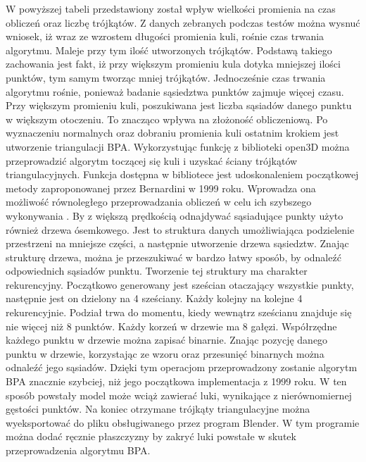 W powyższej tabeli przedstawiony został wpływ wielkości promienia na czas obliczeń oraz liczbę trójkątów. Z danych zebranych podczas testów można wysnuć wniosek, iż wraz ze wzrostem długości promienia kuli, rośnie czas trwania algorytmu. Maleje przy tym ilość utworzonych trójkątów. Podstawą takiego zachowania jest fakt, iż przy większym promieniu kula dotyka mniejszej ilości punktów, tym samym tworząc mniej trójkątów. Jednocześnie czas trwania algorytmu rośnie, ponieważ badanie sąsiedztwa punktów zajmuje więcej czasu. Przy większym promieniu kuli, poszukiwana jest liczba sąsiadów danego punktu w większym otoczeniu. To znacząco wpływa na złożoność obliczeniową.
\newline \indent Po wyznaczeniu normalnych oraz dobraniu promienia kuli ostatnim krokiem jest utworzenie triangulacji BPA. Wykorzystując funkcję z biblioteki open3D można przeprowadzić algorytm toczącej się kuli i uzyskać ściany trójkątów triangulacyjnych. Funkcja dostępna w bibliotece jest udoskonaleniem początkowej metody zaproponowanej przez Bernardini w 1999 roku. Wprowadza ona możliwość równoległego przeprowadzania obliczeń w celu ich szybszego wykonywania \cite{digne2014analysis}. By z większą prędkością odnajdywać sąsiadujące punkty użyto również drzewa ósemkowego. Jest to struktura danych umożliwiająca podzielenie przestrzeni na mniejsze części, a następnie utworzenie drzewa sąsiedztw. Znając strukturę drzewa, można je przeszukiwać w bardzo łatwy sposób, by odnaleźć odpowiednich sąsiadów punktu. Tworzenie tej struktury ma charakter rekurencyjny. Początkowo generowany jest sześcian otaczający wszystkie punkty, następnie jest on dzielony na 4 sześciany. Każdy kolejny na kolejne 4 rekurencyjnie. Podział trwa do momentu, kiedy wewnątrz sześcianu znajduje się nie więcej niż 8 punktów. Każdy korzeń w drzewie ma 8 gałęzi. Współrzędne każdego punktu w drzewie można zapisać binarnie. Znając pozycję danego punktu w drzewie, korzystając ze wzoru oraz przesunięć binarnych można odnaleźć jego sąsiadów. Dzięki tym operacjom przeprowadzony zostanie algorytm BPA znacznie szybciej, niż jego początkowa implementacja z 1999 roku. W ten sposób powstały model może wciąż zawierać luki, wynikające z nierównomiernej gęstości punktów. Na koniec otrzymane trójkąty triangulacyjne można wyeksportować do pliku obsługiwanego przez program Blender. W tym programie można dodać ręcznie płaszczyzny by zakryć luki powstałe w skutek przeprowadzenia algorytmu BPA. 




